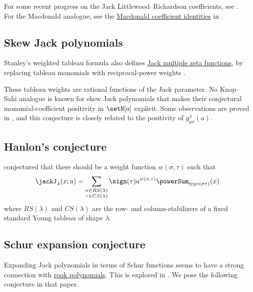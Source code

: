 For some recent progress on the Jack Littlewood--Richardson coefficients, see
\cite{Mickler2023x}.
For the Macdonald analogue, see the
\hyperref[macdonaldLittlewoodRichardsonCoefficient]{Macdonald coefficient identities}
in \cite{Mickler2026Lax}.



\subsection[jackSkew]{Skew Jack polynomials}

Stanley's weighted tableau formula also defines
\hyperref[jackMultipleZeta]{Jack multiple zeta functions}, by replacing
tableau monomials with reciprocal-power weights
\cite{NakasujiTakeda2026x}.

These tableau weights are rational functions of the Jack parameter.
No Knop--Sahi analogue is known for skew Jack polynomials that makes
their conjectural monomial-coefficient positivity in $\setN[a]$ explicit.
Some observations are proved in \cite{BraviGandini2021x}, and this conjecture
is closely related to the positivity of $g^\lambda_{\mu\nu}(a)$.



\subsection[jackCharacterConjecture]{Hanlon's conjecture}


\begin{conjecture}
 conjectured that there should be a weight function
$w(\sigma,\tau)$ such that
\begin{equation*}
\jackJ_\lambda(x;a)
=
\sum_{\substack{\sigma \in RS(\lambda) \\ \tau \in CS(\lambda)}}
\sign(\tau) a^{w(\sigma,\tau)}
\powerSum_{\text{type}(\sigma\tau)}(x)
\end{equation*}
where $RS(\lambda)$ and $CS(\lambda)$ are the row- and column-stabilizers
of a fixed standard Young tableau of shape $\lambda$.
\end{conjecture}



\subsection[jackSchurExpansionConjecture]{Schur expansion conjecture}

Expanding Jack polynomials in terms of Schur functions seems to have a strong
connection with \hyperref[realRootedMatching]{rook polynomials}.  This is
explored in \cite{AlexanderssonHaglundWang2018}.
We pose the following conjecture in that paper.

